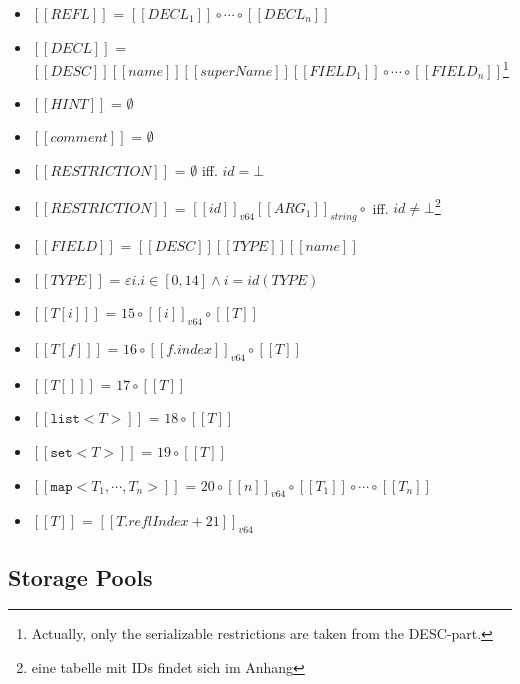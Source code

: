 \documentclass[a4paper,10pt]{article}
\newcommand{\den}[1]{\ensuremath{[\![#1]\!]}}
\begin{document}
\begin{itemize}
 \item \den{REFL} = $\den{DECL_1} \circ \cdots \circ \den{DECL_n}$

 \item \den{DECL} = $\den{DESC}\den{name}\den{superName}\den{FIELD_1}\circ \cdots \circ \den{FIELD_n}$\footnote{Actually, only the serializable restrictions are taken from the DESC-part.}
 
 \item \den{HINT} = $\emptyset$
 
 \item \den{comment} = $\emptyset$
 
 \item \den{RESTRICTION} = $\emptyset$ iff. $id = \bot$
 \item \den{RESTRICTION} = $\den{id}_{v64}\den{ARG_1}_{string} \circ $ iff. $id \neq \bot$\footnote{eine tabelle mit IDs findet sich im Anhang}
 
 \item \den{FIELD} = \den{DESC}\den{TYPE}\den{name}
 
 \item \den{TYPE} = $\varepsilon i. i \in [0,14] \wedge i = id(TYPE)$
 
 \item \den{T[i]} = $15 \circ \den{i}_{v64} \circ \den{T}$
 \item \den{T[f]} = $16 \circ \den{f.index}_{v64} \circ \den{T}$
 \item \den{T[]} = $17 \circ \den{T}$
 \item \den{\texttt{list}<T>} = $18 \circ \den{T}$
 \item \den{\texttt{set}<T>} = $19 \circ \den{T}$
 \item \den{\texttt{map}<T_1, \cdots, T_n>} = $20 \circ \den{n}_{v64} \circ \den{T_1} \circ \cdots \circ \den{T_n}$
 
 \item \den{T} = $\den{T.reflIndex + 21}_{v64}$

\end{itemize}



\subsection{Storage Pools}

\end{document}
